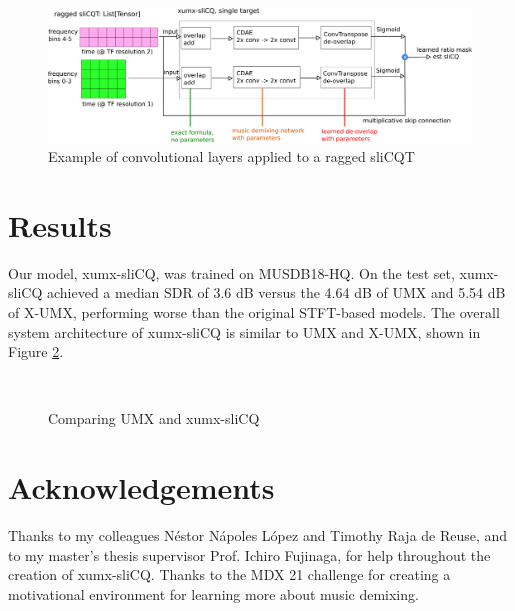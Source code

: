 \documentclass{article}
\begin{document}
\begin{figure}[h]
	\includegraphics[width=\textwidth]{./xumx_slicq_pertarget.png}
	\caption{Example of convolutional layers applied to a ragged sliCQT}
	\label{fig:ragged}
\end{figure}

\section{Results}
\label{sec:results}

Our model, xumx-sliCQ, was trained on MUSDB18-HQ. On the test set, xumx-sliCQ achieved a median SDR of 3.6 dB versus the 4.64 dB of UMX and 5.54 dB of X-UMX, performing worse than the original STFT-based models. The overall system architecture of xumx-sliCQ is similar to UMX and X-UMX, shown in Figure \ref{fig:blockdiagrams}.

\begin{figure}[h]
	\centering
	\\
	\vspace{1em}
	\caption{Comparing UMX and xumx-sliCQ}
	\label{fig:blockdiagrams}
\end{figure}

\section{Acknowledgements}
Thanks to my colleagues Néstor Nápoles López and Timothy Raja de Reuse, and to my master's thesis supervisor Prof. Ichiro Fujinaga, for help throughout the creation of xumx-sliCQ. Thanks to the MDX 21 challenge for creating a motivational environment for learning more about music demixing.
% 
\clearpage\vfill\pagebreak
%
%
%

\raggedend
\printbibheading[title={References},heading=bibnumbered]
\printbibliography[heading=none]
\end{document}
